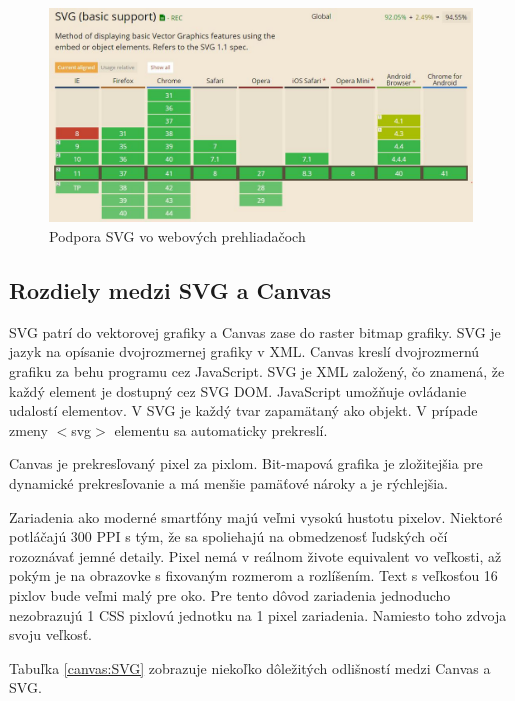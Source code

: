  \begin{figure}[H]
\centering
\includegraphics[width=0.7\linewidth]{obrazky/podpora}
\caption{Podpora SVG vo webových prehliadačoch\cite{caniuse2}}
\label{fig:podpora}
\end{figure}

 
 \subsection{Rozdiely medzi SVG a Canvas}

SVG patrí do vektorovej grafiky a Canvas zase do raster bitmap grafiky. SVG je jazyk na opísanie dvojrozmernej grafiky v XML. Canvas kreslí dvojrozmernú grafiku za behu programu cez JavaScript.  SVG je XML založený, čo znamená, že každý element je dostupný cez SVG DOM.  JavaScript umožňuje ovládanie udalostí elementov. V SVG je každý tvar zapamätaný ako objekt.  V prípade zmeny $<$svg$>$ elementu sa automaticky prekreslí.  
 
Canvas je prekresľovaný pixel za pixlom. Bit-mapová grafika je zložitejšia pre dynamické prekresľovanie a má menšie pamäťové nároky a je rýchlejšia. 
 
Zariadenia ako moderné smartfóny majú veľmi vysokú hustotu pixelov. Niektoré potláčajú 300 \ac{PPI} s tým, že sa spoliehajú na obmedzenosť ľudských očí rozoznávať jemné detaily. Pixel nemá v reálnom živote equivalent vo veľkosti, až pokým je na obrazovke s fixovaným rozmerom a rozlíšením. Text s veľkosťou 16 pixlov bude veľmi malý pre oko. Pre tento dôvod zariadenia jednoducho nezobrazujú 1 CSS pixlovú jednotku na 1 pixel zariadenia. Namiesto toho zdvoja svoju veľkosť. \cite{zdrojCSS}

Tabuľka \ref{canvas:SVG} zobrazuje niekoľko dôležitých odlišností medzi Canvas a SVG.\cite{microsoft}%

